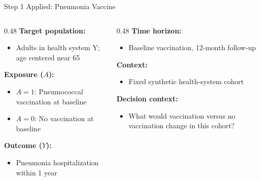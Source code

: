 \documentclass[aspectratio=169]{beamer}
\begin{document}
\begin{frame}{Step 1 Applied: Pneumonia Vaccine}
  \small
  \begin{columns}[T]
    \begin{column}{0.48\textwidth}
      \textbf{Target population:}
      \begin{itemize}
        \item Adults in health system Y; age centered near 65
      \end{itemize}
      \vspace{0.3em}

      \textbf{Exposure ($A$):}
      \begin{itemize}
        \item $A=1$: Pneumococcal vaccination at baseline
        \item $A=0$: No vaccination at baseline
      \end{itemize}
      \vspace{0.3em}

      \textbf{Outcome ($Y$):}
      \begin{itemize}
        \item Pneumonia hospitalization within 1 year
      \end{itemize}
    \end{column}
    \begin{column}{0.48\textwidth}
      \textbf{Time horizon:}
      \begin{itemize}
        \item Baseline vaccination, 12-month follow-up
      \end{itemize}
      \vspace{0.3em}

      \textbf{Context:}
      \begin{itemize}
        \item Fixed synthetic health-system cohort
      \end{itemize}
      \vspace{0.3em}

      \textbf{Decision context:}
      \begin{itemize}
        \item What would vaccination versus no vaccination change in this cohort?
      \end{itemize}
    \end{column}
  \end{columns}
\end{frame}
\end{document}
